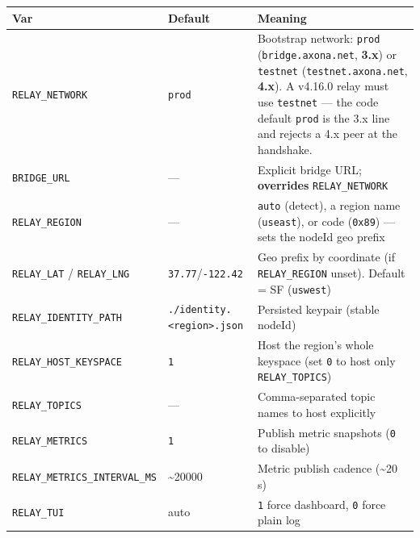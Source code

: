 \documentclass[
  nobib]{tufte-handout}
\newcounter{none} %
\begin{document}
{\def\LTcaptype{none} %
\begin{longtable}[]{@{}
  >{\raggedright\arraybackslash}p{}
  >{\raggedright\arraybackslash}p{}
  >{\raggedright\arraybackslash}p{}@{}}
\toprule\noalign{}
\begin{minipage}[b]{\linewidth}\raggedright
Var
\end{minipage} & \begin{minipage}[b]{\linewidth}\raggedright
Default
\end{minipage} & \begin{minipage}[b]{\linewidth}\raggedright
Meaning
\end{minipage} \\
\midrule\noalign{}
\endhead
\bottomrule\noalign{}
\endlastfoot
\texttt{RELAY\_NETWORK} & \texttt{prod} & Bootstrap network:
\texttt{prod} (\texttt{bridge.axona.net}, \textbf{3.x}) or
\texttt{testnet} (\texttt{testnet.axona.net}, \textbf{4.x}). A v4.16.0
relay must use \texttt{testnet} --- the code default \texttt{prod} is
the 3.x line and rejects a 4.x peer at the handshake. \\
\texttt{BRIDGE\_URL} & --- & Explicit bridge URL; \textbf{overrides}
\texttt{RELAY\_NETWORK} \\
\texttt{RELAY\_REGION} & --- & \texttt{auto} (detect), a region name
(\texttt{useast}), or code (\texttt{0x89}) --- sets the nodeId geo
prefix \\
\texttt{RELAY\_LAT} / \texttt{RELAY\_LNG} &
\texttt{37.77}/\texttt{-122.42} & Geo prefix by coordinate (if
\texttt{RELAY\_REGION} unset). Default = SF (\texttt{uswest}) \\
\texttt{RELAY\_IDENTITY\_PATH} &
\texttt{./identity.\textless{}region\textgreater{}.json} & Persisted
keypair (stable nodeId) \\
\texttt{RELAY\_HOST\_KEYSPACE} & \texttt{1} & Host the region's whole
keyspace (set \texttt{0} to host only \texttt{RELAY\_TOPICS}) \\
\texttt{RELAY\_TOPICS} & --- & Comma-separated topic names to host
explicitly \\
\texttt{RELAY\_METRICS} & \texttt{1} & Publish metric snapshots
(\texttt{0} to disable) \\
\texttt{RELAY\_METRICS\_INTERVAL\_MS} & \textasciitilde20000 & Metric
publish cadence (\textasciitilde20 s) \\
\texttt{RELAY\_TUI} & auto & \texttt{1} force dashboard, \texttt{0}
force plain log \\
\end{longtable}
}
\end{document}
